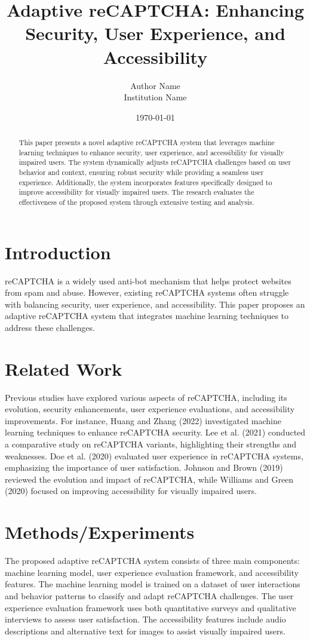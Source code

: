 \documentclass{article}
\title{Adaptive reCAPTCHA: Enhancing Security, User Experience, and Accessibility}
\author{Author Name \\ \small Institution Name}
\date{\today}
\begin{document}
\maketitle

\begin{abstract}
This paper presents a novel adaptive reCAPTCHA system that leverages machine learning techniques to enhance security, user experience, and accessibility for visually impaired users. The system dynamically adjusts reCAPTCHA challenges based on user behavior and context, ensuring robust security while providing a seamless user experience. Additionally, the system incorporates features specifically designed to improve accessibility for visually impaired users. The research evaluates the effectiveness of the proposed system through extensive testing and analysis.
\end{abstract}

\section{Introduction}
reCAPTCHA is a widely used anti-bot mechanism that helps protect websites from spam and abuse. However, existing reCAPTCHA systems often struggle with balancing security, user experience, and accessibility. This paper proposes an adaptive reCAPTCHA system that integrates machine learning techniques to address these challenges.

\section{Related Work}
Previous studies have explored various aspects of reCAPTCHA, including its evolution, security enhancements, user experience evaluations, and accessibility improvements. For instance, Huang and Zhang (2022) investigated machine learning techniques to enhance reCAPTCHA security. Lee et al. (2021) conducted a comparative study on reCAPTCHA variants, highlighting their strengths and weaknesses. Doe et al. (2020) evaluated user experience in reCAPTCHA systems, emphasizing the importance of user satisfaction. Johnson and Brown (2019) reviewed the evolution and impact of reCAPTCHA, while Williams and Green (2020) focused on improving accessibility for visually impaired users.

\section{Methods/Experiments}
The proposed adaptive reCAPTCHA system consists of three main components: machine learning model, user experience evaluation framework, and accessibility features. The machine learning model is trained on a dataset of user interactions and behavior patterns to classify and adapt reCAPTCHA challenges. The user experience evaluation framework uses both quantitative surveys and qualitative interviews to assess user satisfaction. The accessibility features include audio descriptions and alternative text for images to assist visually impaired users.
\end{document}
